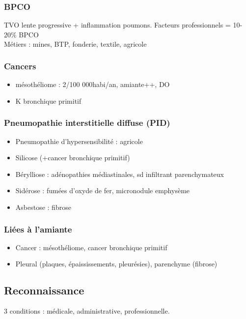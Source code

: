 \documentclass{book}
\begin{document}
\subsubsection{BPCO}
\label{sec:org589f2a3}
\gls{TVO} lente progressive + inflammation
poumons. Facteurs professionnels = 10-20\% BPCO\\
Métiers : mines, BTP, fonderie, textile, agricole
\subsubsection{Cancers}
\label{sec:org28149fe}

\begin{itemize}
\item mésothéliome : 2/100 000habi/an, amiante++, DO
\item K bronchique primitif
\end{itemize}

\subsubsection{Pneumopathie interstitielle diffuse (PID)}
\label{sec:org1ee0671}

\begin{itemize}
\item Pneumopathie d'hypersensibilité : agricole
\item Silicose (+cancer bronchique primitif)
\item Bérylliose : adénopathies médiastinales, sd infiltrant parenchymateux
\item Sidérose : fumées d'oxyde de fer, micronodule \textpm{} emphysème
\item Asbestose : fibrose
\end{itemize}

\subsubsection{Liées à l'amiante}
\label{sec:org96b6636}

\begin{itemize}
\item Cancer : mésothéliome, cancer bronchique primitif
\item Pleural (plaques, épaississements, pleurésies), parenchyme (fibrose)
\end{itemize}

\subsection{Reconnaissance}
\label{sec:orgcb0c26a}
3 conditions : médicale, administrative, professionnelle. 
\end{document}
